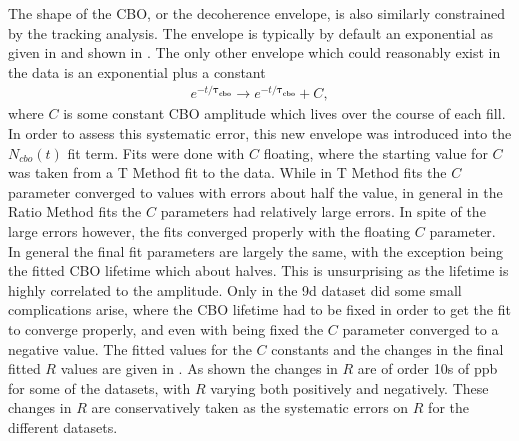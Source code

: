 The shape of the CBO, or the decoherence envelope, is also similarly constrained by the tracking analysis. The envelope is typically by default an exponential as given in  and shown in . The only other envelope which could reasonably exist in the data is an exponential plus a constant
    \begin{align}
        e^{-t/\boldsymbol{\tau_{cbo}}} \rightarrow e^{-t/\boldsymbol{\tau_{cbo}}} + C,
    \end{align}
where $C$ is some constant CBO amplitude which lives over the course of each fill. In order to assess this systematic error, this new envelope was introduced into the $N_{cbo}(t)$ fit term. Fits were done with $C$ floating, where the starting value for $C$ was taken from a T Method fit to the data. While in T Method fits the $C$ parameter converged to values with errors about half the value, in general in the Ratio Method fits the $C$ parameters had relatively large errors. In spite of the large errors however, the fits converged properly with the floating $C$ parameter. In general the final fit parameters are largely the same, with the exception being the fitted CBO lifetime which about halves. This is unsurprising as the lifetime is highly correlated to the amplitude. Only in the 9d dataset did some small complications arise, where the CBO lifetime had to be fixed in order to get the fit to converge properly, and even with being fixed the $C$ parameter converged to a negative value. The fitted values for the $C$ constants and the changes in the final fitted $R$ values are given in . As shown the changes in $R$ are of order 10s of ppb for some of the datasets, with $R$ varying both positively and negatively. These changes in $R$ are conservatively taken as the systematic errors on $R$ for the different datasets.



